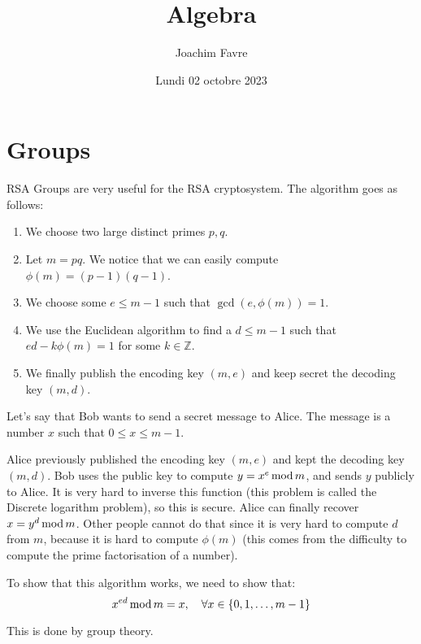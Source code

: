\documentclass[a4paper]{article}
\title{Algebra}
\author{Joachim Favre}
\date{Lundi 02 octobre 2023}
\begin{document}
\maketitle


\section{Groups}

\begin{parag}{RSA}
    Groups are very useful for the RSA cryptosystem. The algorithm goes as follows:
    \begin{enumerate}
        \item We choose two large distinct primes $p, q$.
        \item Let $m = pq$. We notice that we can easily compute $\phi\left(m\right) = \left(p-1\right)\left(q-1\right)$.
        \item We choose some $e \leq m-1$ such that $\gcd\left(e, \phi\left(m\right)\right) = 1$.
        \item We use the Euclidean algorithm to find a $d \leq m-1$ such that $ed - k \phi\left(m\right) = 1$ for some $k \in \mathbb{Z}$.
        \item We finally publish the encoding key $\left(m, e\right)$ and keep secret the decoding key $\left(m, d\right)$.
    \end{enumerate}
    
    Let's say that Bob wants to send a secret message to Alice. The message is a number $x$ such that $0 \leq x \leq m - 1$.

    Alice previously published the encoding key $\left(m, e\right)$ and kept the decoding key $\left(m, d\right)$. Bob uses the public key to compute $y = x^e \operatorname{mod} m$, and sends $y$ publicly to Alice. It is very hard to inverse this function (this problem is called the Discrete logarithm problem), so this is secure. Alice can finally recover $x = y^d \operatorname{mod} m$. Other people cannot do that since it is very hard to compute $d$ from $m$, because it is hard to compute $\phi\left(m\right)$ (this comes from the difficulty to compute the prime factorisation of a number).
    
    To show that this algorithm works, we need to show that: 
    \[x^{ed} \Mod m = x, \mathspace \forall x \in \left\{0, 1, \ldots, m-1\right\}\]
    
    This is done by group theory.
\end{parag}
\end{document}
